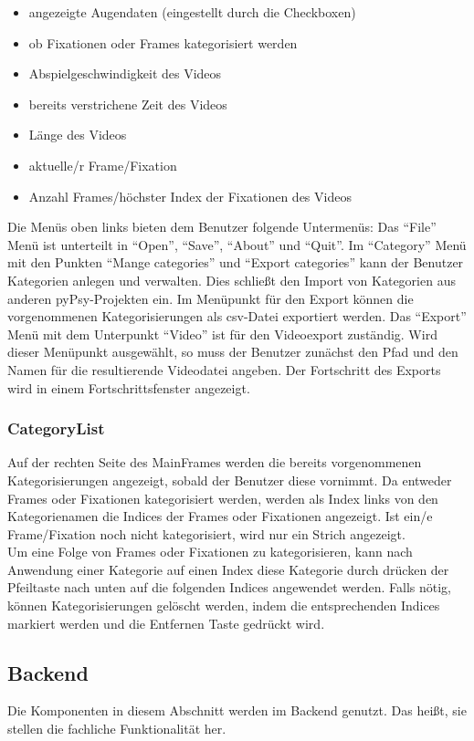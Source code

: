 \documentclass[a4paper,draft]{scrartcl}
\begin{document}
\begin{itemize}
\item angezeigte Augendaten (eingestellt durch die Checkboxen)
\item ob Fixationen oder Frames kategorisiert werden
\item Abspielgeschwindigkeit des Videos
\item bereits verstrichene Zeit des Videos
\item Länge des Videos
\item aktuelle/r Frame/Fixation 
\item Anzahl Frames/höchster Index der Fixationen des Videos
\end{itemize}
Die Menüs oben links bieten dem Benutzer folgende Untermenüs:
Das "`File"' Menü ist unterteilt in "`Open"', "`Save"', "`About"' und "`Quit"'. 
Im "`Category"' Menü mit den Punkten "`Mange categories"' und "`Export categories"' kann der Benutzer Kategorien anlegen und verwalten. Dies schließt den Import von Kategorien aus anderen pyPsy-Projekten ein.
Im Menüpunkt für den Export können die vorgenommenen Kategorisierungen als csv-Datei exportiert werden. 
Das "`Export"' Menü mit dem Unterpunkt "`Video"' ist für den Videoexport zuständig. Wird dieser Menüpunkt ausgewählt, so muss der Benutzer zunächst den Pfad und den Namen für die resultierende Videodatei angeben. Der Fortschritt des Exports wird in einem Fortschrittsfenster angezeigt.


\subsubsection{CategoryList}
Auf der rechten Seite des MainFrames werden die bereits vorgenommenen Kategorisierungen angezeigt, sobald der Benutzer diese vornimmt. 
Da entweder Frames oder Fixationen kategorisiert werden, werden als Index links von den Kategorienamen die Indices der Frames oder Fixationen angezeigt. Ist ein/e Frame/Fixation noch nicht kategorisiert, wird nur ein Strich angezeigt. \\
Um eine Folge von Frames oder Fixationen zu kategorisieren, kann nach Anwendung einer Kategorie auf einen Index diese Kategorie durch drücken der Pfeiltaste nach unten auf die folgenden Indices angewendet werden.
Falls nötig, können Kategorisierungen gelöscht werden, indem die entsprechenden Indices markiert werden und die Entfernen Taste gedrückt wird. 

\subsection{Backend}
Die Komponenten in diesem Abschnitt werden im Backend genutzt.
Das hei\ss t, sie stellen die fachliche Funktionalit\"at her.
\end{document}
